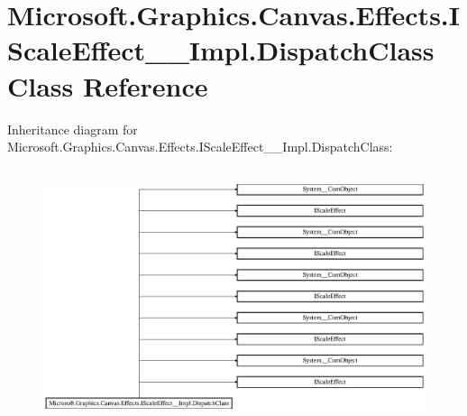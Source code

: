 \hypertarget{class_microsoft_1_1_graphics_1_1_canvas_1_1_effects_1_1_i_scale_effect_____impl_1_1_dispatch_class}{}\section{Microsoft.\+Graphics.\+Canvas.\+Effects.\+I\+Scale\+Effect\+\_\+\+\_\+\+Impl.\+Dispatch\+Class Class Reference}
\label{class_microsoft_1_1_graphics_1_1_canvas_1_1_effects_1_1_i_scale_effect_____impl_1_1_dispatch_class}
Inheritance diagram for Microsoft.\+Graphics.\+Canvas.\+Effects.\+I\+Scale\+Effect\+\_\+\+\_\+\+Impl.\+Dispatch\+Class\+:\begin{figure}[H]
\begin{center}
\leavevmode
\includegraphics[height=7.512195cm]{class_microsoft_1_1_graphics_1_1_canvas_1_1_effects_1_1_i_scale_effect_____impl_1_1_dispatch_class}
\end{center}
\end{figure}
